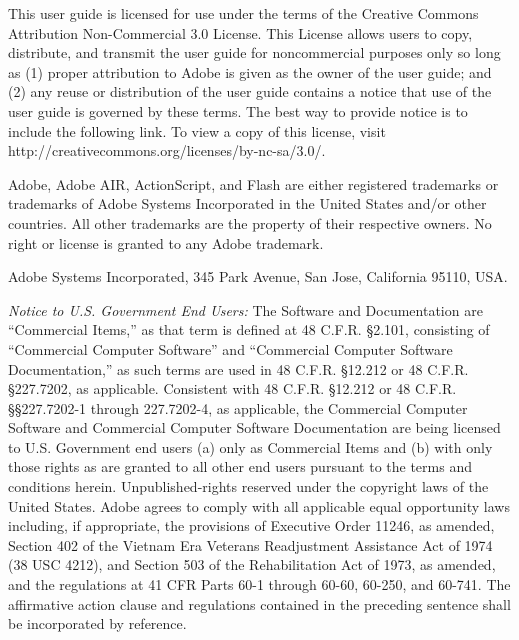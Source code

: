 This user guide is licensed for use under the terms of the Creative Commons Attribution
Non-Commercial 3.0 License. This License allows users to copy, distribute, and transmit the user
guide for noncommercial purposes only so long as (1) proper attribution to Adobe is given as the
owner of the user guide; and (2) any reuse or distribution of the user guide contains a notice that
use of the user guide is governed by these terms. The best way to provide notice is to include the
following link. To view a copy of this license, visit http://creativecommons.org/licenses/by-nc-sa/3.0/.

Adobe, Adobe AIR, ActionScript, and Flash are either registered
trademarks or trademarks of Adobe Systems Incorporated in the United States and/or other countries. All other trademarks are the
property of their respective owners.  No right or license is granted to any Adobe trademark.

Adobe Systems Incorporated, 345 Park Avenue, San Jose, California 95110, USA.

\emph{Notice to U.S. Government End Users:} The Software and Documentation are ``Commercial Items,'' as
that term is defined at 48 C.F.R. \S2.101, consisting of ``Commercial Computer Software'' and
``Commercial Computer Software Documentation,'' as such terms are used in 48 C.F.R. \S12.212
or 48 C.F.R. \S227.7202, as applicable. Consistent with 48 C.F.R. \S12.212 or 48 C.F.R.
\S\S227.7202-1 through 227.7202-4, as applicable, the Commercial Computer Software and
Commercial Computer Software Documentation are being licensed to U.S. Government end users (a) only
as Commercial Items and (b) with only those rights as are granted to all other end users pursuant
to the terms and conditions herein. Unpublished-rights reserved under the copyright laws of the
United States. Adobe agrees to comply with all applicable equal opportunity
laws including, if appropriate, the provisions of Executive Order 11246, as amended, Section 402 of the Vietnam Era
Veterans Readjustment Assistance Act of 1974 (38 USC 4212), and Section 503 of the Rehabilitation
Act of 1973, as amended, and the regulations at 41 CFR Parts 60-1 through 60-60, 60-250, and 60-741.
The affirmative action clause and regulations contained in the preceding
sentence shall be incorporated by reference.

\pagebreak

\tableofcontents

\pagebreak







\appendix

%


